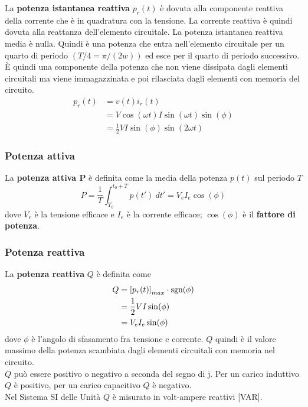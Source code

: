 \documentclass{article}
\begin{document}
La \textbf{potenza istantanea reattiva} $p_r(t)$ è dovuta
alla componente reattiva della corrente che è in
quadratura con la tensione. La corrente reattiva
è quindi dovuta alla reattanza dell'elemento circuitale. La potenza istantanea reattiva media è
nulla. Quindi è una potenza che entra nell'elemento circuitale per un quarto di periodo $(T/4 =\pi/(2w))$ ed esce per il quarto di periodo successivo. È quindi una componente della potenza
che non viene dissipata dagli elementi circuitali
ma viene immagazzinata e poi rilasciata dagli
elementi con memoria del circuito.
\begin{align*}
    p_r(t) &= v(t)i_r(t)
    \\
    &= V \cos(\omega t)I \sin(\omega t)\sin(\phi)
    \\
    &= \frac{1}{2}VI\sin(\phi)\sin(2\omega t)
\end{align*}

\subsubsection{Potenza attiva}
La \textbf{potenza attiva P} è definita come la media della potenza $p(t)$ sul periodo $T$
\[P = \frac{1}{T} \int_{T_0}^{t_0+T}p(t') \ dt' = V_eI_e\cos(\phi)\]
dove $V_e$ è la tensione efficace e $I_e$ è la corrente efficace; $\cos(\phi)$ è il \textbf{fattore di potenza}.

\subsubsection{Potenza reattiva}
La \textbf{potenza reattiva} $Q$ è definita come
\begin{align*}
    Q &= \left[p_r(t)\right]_{max} \cdot \text{sgn}(\phi)
    \\
    &=\frac{1}{2}VI\sin(\phi)
    \\
    &=V_eI_e \sin(\phi)
\end{align*}
dove $\phi$ è l'angolo di sfasamento fra tensione e corrente. $Q$ quindi è il valore massimo della potenza scambiata dagli elementi circuitali con memoria nel circuito.\\
$Q$ può essere positivo o negativo a seconda del segno di j. Per un carico induttivo $Q$ è positivo, per un carico capacitivo $Q$ è negativo.\\
Nel Sistema SI delle Unità $Q$ è misurato in volt-ampere reattivi [VAR].
\end{document}

